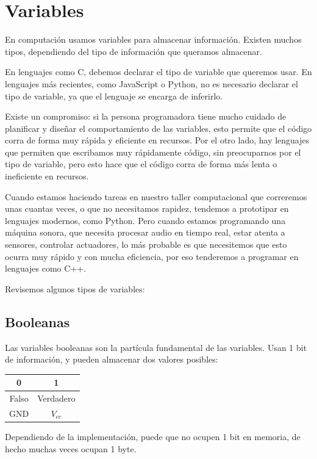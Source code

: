 \documentclass[../principal.tex]{subfiles}
\begin{document}
\chapter{Variables}

En computación usamos variables para almacenar información. Existen muchos tipos, dependiendo del tipo de información que queramos almacenar.

En lenguajes como C, debemos declarar el tipo de variable que queremos usar. En lenguajes más recientes, como JavaScript o Python, no es necesario declarar el tipo de variable, ya que el lenguaje se encarga de inferirlo.

Existe un compromiso: si la persona programadora tiene mucho cuidado de planificar y diseñar el comportamiento de las variables, esto permite que el código corra de forma muy rápida y eficiente en recursos. Por el otro lado, hay lenguajes que permiten que escribamos muy rápidamente código, sin preocuparnos por el tipo de variable, pero esto hace que el código corra de forma más lenta o ineficiente en recursos.

Cuando estamos haciendo tareas en nuestro taller computacional que correremos unas cuantas veces, o que no necesitamos rapidez, tendemos a prototipar en lenguajes modernos, como Python. Pero cuando estamos programando una máquina sonora, que necesita procesar audio en tiempo real, estar atenta a sensores, controlar actuadores, lo más probable es que necesitemos que esto ocurra muy rápido y con mucha eficiencia, por eso tenderemos a programar en lenguajes como C++.

Revisemos algunos tipos de variables:

\section{Booleanas}

Las variables booleanas son la partícula fundamental de las variables. Usan 1 bit de información, y pueden almacenar dos valores posibles:

\begin{table}[H]
\begin{tabular}{c|c}
    \textbf{0} & \textbf{1} \\
    \hline
    Falso & Verdadero \\
    GND & $V_{cc}$ \\
\end{tabular}
\end{table}

Dependiendo de la implementación, puede que no ocupen 1 bit en memoria, de hecho muchas veces ocupan 1 byte.
\end{document}

